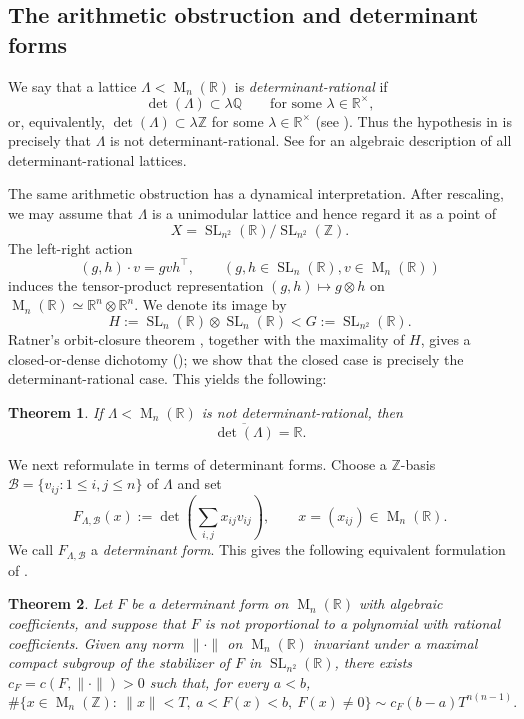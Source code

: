 \documentclass[reqno,11pt]{amsart}
\numberwithin{equation}{section}
\newtheorem{theorem}{Theorem}[section]
\theoremstyle{definition}
\theoremstyle{remark}
\newcommand{\op}{\operatorname}
\newcommand{\br}{\mathbb R}
\newcommand{\M}{\op{M}}
\newcommand{\SL}{\op{SL}}
\begin{document}
\subsection{The arithmetic obstruction and determinant forms}

We say that a lattice $\Lambda<\M_n(\mathbb R)$ is
\emph{determinant-rational} if
$$
\det(\Lambda)\subset\lambda\mathbb Q
\qquad
\text{for some }\lambda\in\mathbb R^\times,
$$
or, equivalently,
$
\det(\Lambda)\subset\lambda\mathbb Z$
for some $\lambda\in\mathbb R^\times
$ (see ).
Thus the hypothesis in  is precisely that $\Lambda$ is not
determinant-rational.
See  for an algebraic description of all determinant-rational lattices.

The same arithmetic obstruction has a dynamical interpretation. After
rescaling, we may assume that $\Lambda$ is a unimodular lattice and hence regard it  as a
point of
$$
X=\SL_{n^2}(\mathbb R)/\SL_{n^2}(\mathbb Z).
$$
The left-right action
$$
(g,h)\cdot v=g v h^{\intercal},
\qquad (g,h\in\SL_n(\mathbb R), v\in \M_n(\br))
$$
induces the tensor-product representation
$(g,h)\mapsto g\otimes h$ on
$\M_n(\mathbb R)\simeq\mathbb R^n\otimes\mathbb R^n$. We denote its image by
$$
H:=\SL_n(\mathbb R)\otimes\SL_n(\mathbb R)<G:=\SL_{n^2}(\mathbb R).
$$
 Ratner's orbit-closure theorem \cite{ratner:1991}, together with the
maximality of $H$, gives a closed-or-dense dichotomy (); we show that the closed case is precisely the
determinant-rational case. This yields the following:
\begin{theorem}\label{prop:intro-density}
If $\Lambda<\M_n(\mathbb R)$ is not determinant-rational, then
$$
\overline{\det(\Lambda)}=\mathbb R.
$$
\end{theorem}

We next reformulate  in terms of determinant forms. Choose a
$\mathbb Z$-basis $\mathcal B=\{v_{ij}:1\le i,j\le n\}$ of $\Lambda$ and
set
$$
F_{\Lambda,\mathcal B}(x)
:=
\det\!\left(\sum_{i,j}x_{ij}v_{ij}\right),
\qquad x=(x_{ij})\in\M_n(\mathbb R).
$$
We call $F_{\Lambda,\mathcal B}$ a \emph{determinant form}. This gives the following equivalent formulation of . 
\begin{theorem}\label{m2}
Let $F$ be a determinant form on $\M_n(\mathbb R)$ with algebraic
coefficients, and suppose that $F$ is not proportional to a polynomial with
rational coefficients. Given any norm $\|\cdot \|$ on $\M_n(\br)$ invariant under a maximal compact subgroup
of the stabilizer of $F$ in $\SL_{n^2}(\mathbb R)$,  there exists
$c_F=c(F,\|\cdot\|)>0$ such that, for every $a<b$,
$$
\#\{x\in\M_n(\mathbb Z):\ \|x\|<T,\ a<F(x)<b,\ F(x)\ne0\}
\sim
c_F(b-a)T^{n(n-1)}.
$$
\end{theorem}
\end{document}
